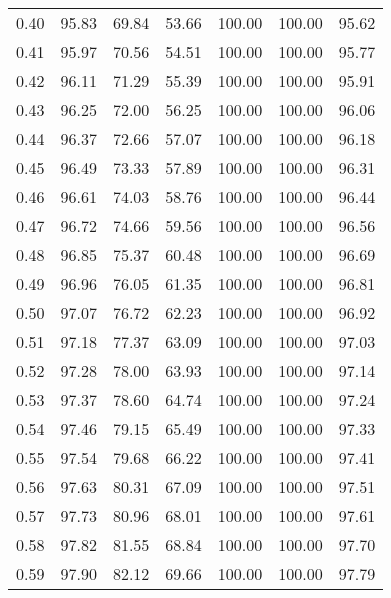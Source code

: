 \begin{tabular}{|c|c|c|c|c|c|c|}
      0.40 &     95.83 &     69.84 &      53.66 &  100.00 &     100.00 &         95.62 \\
      0.41 &     95.97 &     70.56 &      54.51 &  100.00 &     100.00 &         95.77 \\
      0.42 &     96.11 &     71.29 &      55.39 &  100.00 &     100.00 &         95.91 \\
      0.43 &     96.25 &     72.00 &      56.25 &  100.00 &     100.00 &         96.06 \\
      0.44 &     96.37 &     72.66 &      57.07 &  100.00 &     100.00 &         96.18 \\
      0.45 &     96.49 &     73.33 &      57.89 &  100.00 &     100.00 &         96.31 \\
      0.46 &     96.61 &     74.03 &      58.76 &  100.00 &     100.00 &         96.44 \\
      0.47 &     96.72 &     74.66 &      59.56 &  100.00 &     100.00 &         96.56 \\
      0.48 &     96.85 &     75.37 &      60.48 &  100.00 &     100.00 &         96.69 \\
      0.49 &     96.96 &     76.05 &      61.35 &  100.00 &     100.00 &         96.81 \\
      0.50 &     97.07 &     76.72 &      62.23 &  100.00 &     100.00 &         96.92 \\
      0.51 &     97.18 &     77.37 &      63.09 &  100.00 &     100.00 &         97.03 \\
      0.52 &     97.28 &     78.00 &      63.93 &  100.00 &     100.00 &         97.14 \\
      0.53 &     97.37 &     78.60 &      64.74 &  100.00 &     100.00 &         97.24 \\
      0.54 &     97.46 &     79.15 &      65.49 &  100.00 &     100.00 &         97.33 \\
      0.55 &     97.54 &     79.68 &      66.22 &  100.00 &     100.00 &         97.41 \\
      0.56 &     97.63 &     80.31 &      67.09 &  100.00 &     100.00 &         97.51 \\
      0.57 &     97.73 &     80.96 &      68.01 &  100.00 &     100.00 &         97.61 \\
      0.58 &     97.82 &     81.55 &      68.84 &  100.00 &     100.00 &         97.70 \\
      0.59 &     97.90 &     82.12 &      69.66 &  100.00 &     100.00 &         97.79 \\

\end{tabular}
